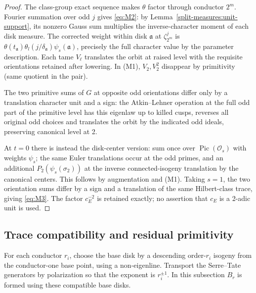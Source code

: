 \begin{proof}
The class-group exact sequence makes \(\theta\) factor through conductor
\(2^m\).  Fourier summation over odd \(j\) gives
\eqref{eq:M2}: by Lemma~\ref{split-measures:unit-support}, its nonzero
Gauss sum multiplies the inverse-character moment of each disk measure. The corrected weight within disk \(\mathfrak a\) at \(\zeta_{2^m}^{j}\) is \(\theta(t_{\mathfrak a})\theta_l(j/\delta_{\mathfrak a})\psi_s(\mathfrak a)\), precisely the full character value by the parameter description. Each tame \(V_\ell\) translates the orbit at raised level with the requisite orientations retained after lowering. In (M1), \(V_2,V_2^2\) disappear by primitivity (same quotient in the pair). 

The two primitive sums of \(G\) at opposite odd orientations differ only by a translation character unit and a sign: the Atkin--Lehner operation at the full odd part of the primitive level has this eigenlaw up to killed cusps, reverses all original odd choices and translates the orbit by the indicated odd ideals, preserving canonical level at 2.

At \(t=0\) there is instead the disk-center version: sum once over \(\operatorname{Pic}(\mathcal O_s)\) with weights \(\psi_s\); the same Euler translations occur at the odd primes, and an additional \(P_2(\psi_s(\sigma_2))\) at the inverse connected-isogeny translation by the canonical centers. This follows by augmentation and (M1). Taking \(s=1\), the two orientation sums differ by a sign and a
translation of the same Hilbert-class trace, giving \eqref{eq:M3}.
The factor \(c_E^{-2}\) is retained exactly; no assertion that \(c_E\) is
a 2-adic unit is used.
\end{proof}

\subsection{Trace compatibility and residual primitivity}

For each conductor \(r_i\), choose the base disk by a descending
order-\(r_i\) isogeny from the conductor-one base point, using a
non-eigenline.  Transport the Serre--Tate generators by polarization so
that the exponent is \(r_i^{\pm1}\).  In this subsection \(B_r\) is
formed using these compatible base disks.

